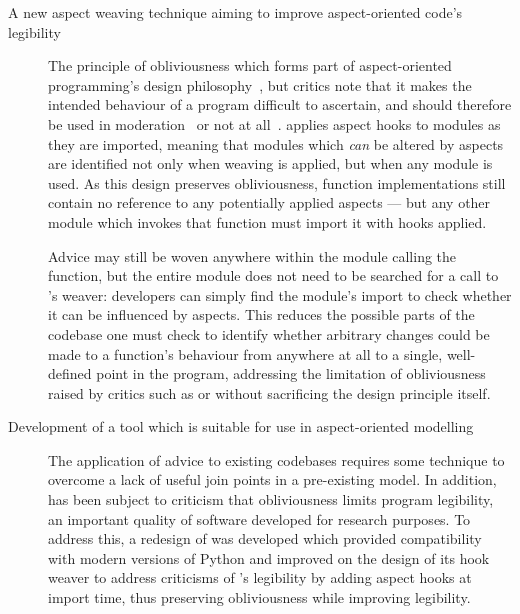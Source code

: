 \begin{description}

  \item[A new aspect weaving technique aiming to improve aspect-oriented code's legibility]
    The principle of obliviousness which forms part of aspect-oriented
    programming's design
    philosophy~\cite{filman2000aspect,kell2008survey,Charfi2006AspectOrientedWL},
    but critics note that it makes the intended behaviour of a program difficult
    to ascertain, and should therefore be used in
    moderation~\cite{leavens2007multiple} or not at
    all~\cite{przybylek2010wrong,Constantinides04aopconsidered}. \pdsf{} applies
    aspect hooks to modules as they are imported, meaning that modules which
    \emph{can} be altered by aspects are identified not only when weaving is
    applied, but when any module is used. As this design preserves
    obliviousness, function implementations still contain no reference to any
    potentially applied aspects --- but any other module which invokes that function
    must import it with hooks applied.

    Advice may still be woven anywhere within the module calling the function,
    but the entire module does not need to be searched for a call to \pdsf{}'s
    weaver: developers can simply find the module's import to check whether it
    can be influenced by aspects. This reduces the possible parts of the
    codebase one must check to identify whether arbitrary changes could be made
    to a function's behaviour from anywhere at all to a single, well-defined
    point in the program, addressing the limitation of obliviousness raised by
    critics such as \citet{leavens2007multiple} or
    \citet{Constantinides04aopconsidered} without sacrificing the design
    principle itself.


  \item[Development of a tool which is suitable for use in aspect-oriented
    modelling] The application of advice to existing codebases
    requires some technique to overcome a lack of useful join points in a
    pre-existing model. In addition, \aop{} has been subject to criticism that
    obliviousness limits program legibility, an important quality of software
    developed for research purposes. To address this, a redesign of \pdsf{} was
    developed which provided compatibility with modern versions of Python and
    improved on the design of its hook weaver to address criticisms of \aop{}'s
    legibility by adding aspect hooks at import time, thus preserving
    obliviousness while improving legibility.


\end{description}
